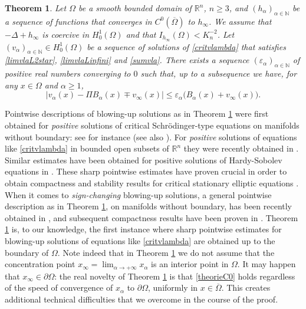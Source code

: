 \documentclass[10pt]{amsart}
\numberwithin{equation}{section}
\newcommand{\R}{\mathbb{R}}
\newcommand{\ve}{\varepsilon}
\newcommand{\Om}{\Omega}
\def \rr {\mathbb{R}}
\def\la{\alpha}
\def \va{v_{\alpha}}
\def \ha{h_{\alpha}}
\def \hi{h_{\infty}}
\def \vo {v_{\infty}}
\def \nn{\mathbb{N}}
\theoremstyle{plain}
\newtheorem{theo}{Theorem}[section]%
\theoremstyle{remark}
\begin{document}
\begin{theo}\label{maintheo1}
	Let $\Om$ be a smooth bounded domain of $\rr^n$, $n\geq 3$, and $(\ha)_{\alpha\in\nn}$ be a sequence of functions that converges in $C^{0}(\overline{\Om})$ to $\hi$. We assume that $-\Delta+\hi$ is coercive in $H^1_0(\Om)$ and that $I_{\hi}(\Om)<K_{n}^{-2}$. Let $(\va)_{\alpha\in\nn}\in H_0^1(\Om)$ be a sequence of solutions of \eqref{critvlambda} that satisfies \eqref{limvlaL2star}, \eqref{limvlaLinfini} and \eqref{sumvla}. 
	There exists a sequence $(\ve_\alpha)_{\alpha \in\nn}$ of positive real numbers converging to $0$ such that, up to a subsequence we have, for any $x \in \Om$ and $\alpha \ge 1$,
	\begin{equation}\label{theorieC0}
		\Big| v_{\la}(x) - \Pi B_\alpha(x) \mp v_\infty(x) \Big| \leq \ve_\alpha \big(  B_{\alpha}(x)+\vo(x)\big). 
		\end{equation}
\end{theo}
Pointwise descriptions of blowing-up solutions as in Theorem \ref{maintheo1} were first obtained for \emph{positive} solutions of critical Schr\"odinger-type equations on manifolds without boundary: see for instance \cite{DHpde, DHR} (see also \cite{HebeyZLAM}). For \emph{positive} solutions of equations like \eqref{critvlambda} in bounded open subsets of $\R^n$ they were recently obtained in \cite{LaurainKonig, LaurainKonig2}. Similar estimates have been obtained for positive solutions of Hardy-Sobolev equations in  \cite{cheikh2022second, GhoussoubMazumdarRobert}. These sharp pointwise estimates have proven crucial in order to obtain compactness and stability results for critical stationary elliptic equations \cite{DruetJDG, DruetLaurain}. When it comes to \emph{sign-changing} blowing-up solutions, a general pointwise description as in Theorem \ref{maintheo1}, on manifolds without boundary, has been recently obtained in \cite{premoselli2024priori, PremoselliRobert}, and subsequent compactness results have been proven in \cite{PremoselliRobert, PremoselliVetois2, PremoselliVetois3}. Theorem \ref{maintheo1} is, to our knowledge, the first instance where sharp pointwise estimates for blowing-up solutions of equations like \eqref{critvlambda} are obtained up to the boundary of $\Om$. Note indeed that in Theorem \ref{maintheo1} we do not assume that the concentration point $x_\infty = \lim_{\alpha \to + \infty} x_\alpha$ is an interior point in $\Om$. It may happen that $x_\infty \in \partial \Om$: the real novelty of Theorem \ref{maintheo1} is that \eqref{theorieC0} holds regardless of the speed of convergence of $x_\alpha$ to $\partial \Om$, uniformly in $x \in \overline{ \Om}$. This creates additional technical difficulties that we overcome in the course of the proof. 
 
\end{document}
